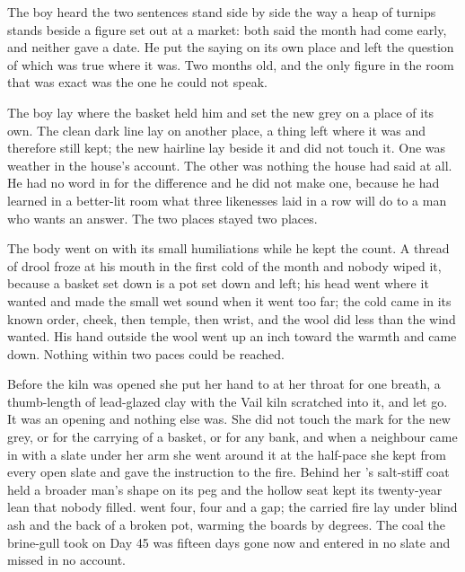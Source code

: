 The boy heard the two sentences stand side by side the way a heap of turnips stands beside a figure set out at a market: both said the month had come early, and neither gave a date. He put the saying on its own place and left the question of which was true where it was. Two months old, and the only figure in the room that was exact was the one he could not speak.

The boy lay where the basket held him and set the new grey on a place of its own. The clean dark line lay on another place, a thing left where it was and therefore still kept; the new hairline lay beside it and did not touch it. One was weather in the house's account. The other was nothing the house had said at all. He had no word in  for the difference and he did not make one, because he had learned in a better-lit room what three likenesses laid in a row will do to a man who wants an answer. The two places stayed two places.

The body went on with its small humiliations while he kept the count. A thread of drool froze at his mouth in the first cold of the month and nobody wiped it, because a basket set down is a pot set down and left; his head went where it wanted and made the small wet sound when it went too far; the cold came in its known order, cheek, then temple, then wrist, and the wool did less than the wind wanted. His hand outside the wool went up an inch toward the warmth and came down. Nothing within two paces could be reached.

Before the kiln was opened she put her hand to  at her throat for one breath, a thumb-length of lead-glazed clay with the Vail kiln scratched into it, and let go. It was an opening and nothing else was. She did not touch the mark for the new grey, or for the carrying of a basket, or for any bank, and when a neighbour came in with a slate under her arm she went around it at the half-pace she kept from every open slate and gave the instruction to the fire. Behind her 's salt-stiff coat held a broader man's shape on its peg and the hollow seat kept its twenty-year lean that nobody filled.  went four, four and a gap; the carried fire lay under blind ash and the back of a broken pot, warming the boards by degrees. The coal the brine-gull took on Day 45 was fifteen days gone now and entered in no slate and missed in no account.

\scenebreak

